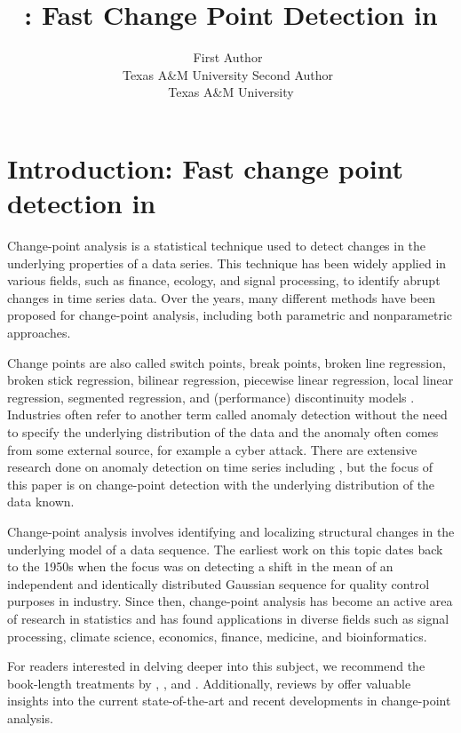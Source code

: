 \documentclass[article]{jss}
\author{First Author~\orcidlink{0009-0006-2493-0853}\\Texas A\&M University
   \And Second Author~\orcidlink{0009-0006-2493-0853}\\Texas A\&M University}
\title{\pkg{fastcpd}: Fast Change Point Detection in \proglang{R}}
\begin{document}

\section[Introduction: Fast change point detection in R]{Introduction: Fast change point detection in } \label{sec:intro}

Change-point analysis is a statistical technique used to detect changes in the
underlying properties of a data series. This technique has been widely applied
in various fields, such as finance, ecology, and signal processing, to identify
abrupt changes in time series data. Over the years, many different methods have
been proposed for change-point analysis, including both parametric and
nonparametric approaches.

Change points are also called switch points, break points, broken line
regression, broken stick regression, bilinear regression, piecewise linear
regression, local linear regression, segmented regression, and (performance)
discontinuity models \citep{lindelov2020mcp}. Industries often refer to another term called anomaly
detection without the need to specify the underlying distribution of
the data and the anomaly often comes from some external source, for example
a cyber attack. There are extensive research done on anomaly detection on time
series including \cite{shipmon2017time}, but the focus of this paper is on
change-point detection with the underlying distribution of the data known.

Change-point analysis involves identifying and localizing structural changes in
the underlying model of a data sequence. The earliest work on this topic dates
back to the 1950s when the focus was on detecting a shift in the mean of an
independent and identically distributed Gaussian sequence for quality control
purposes in industry\cite{page1954continuous}. Since then, change-point analysis
has become an active
area of research in statistics and has found applications in diverse fields
such as signal processing, climate science, economics, finance, medicine, and
bioinformatics.

For readers interested in delving deeper into this subject, we recommend the
book-length treatments by \cite{brodsky1993nonparametric}, \cite{csorgo1997limit},
and \cite{tartakovsky2014sequential}. Additionally, reviews by
\cite{aue2013structural, niu2016multiple, aminikhanghahi2017survey, truong2020selective, liu2022high}
offer valuable insights into the current state-of-the-art and
recent developments in change-point analysis.
\end{document}
